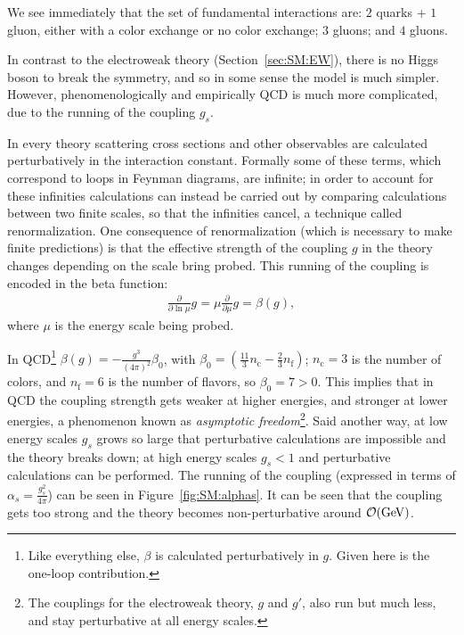 We see immediately that the set of fundamental interactions are: $2$ quarks + $1$ gluon, either with a color exchange or no color exchange; $3$ gluons; and $4$ gluons.

In contrast to the electroweak theory (Section~\ref{sec:SM:EW}), there is no Higgs boson to break the symmetry, and so in some sense the model is much simpler.
However, phenomenologically and empirically QCD is much more complicated, due to the running of the coupling $g_s$.

In every theory scattering cross sections and other observables are calculated perturbatively in the interaction constant.
Formally some of these terms, which correspond to loops in Feynman diagrams, are infinite; in order to account for these infinities calculations can instead be carried out by comparing calculations between two finite scales, so that the infinities cancel, a technique called renormalization.
One consequence of renormalization (which is necessary to make finite predictions) is that the effective strength of the coupling $g$ in the theory changes depending on the scale bring probed.
This running of the coupling is encoded in the beta function:
\begin{align}
  \frac{\partial}{\partial \ln \mu}g = \mu\frac{\partial}{\partial\mu}g = \beta(g),
\end{align}
where $\mu$ is the energy scale being probed.

In QCD\footnote{Like everything else, $\beta$ is calculated perturbatively in $g$. Given here is the one-loop contribution.} $\beta(g) = -\frac{g^3}{(4\pi)^2}\beta_0$, with $\beta_0=(\frac{11}{3}n_\text{c} - \frac{2}{3} n_\text{f})$; $n_\text{c}=3$ is the number of colors, and $n_\text{f}=6$ is the number of flavors, so $\beta_0=7>0$.
This implies that in QCD the coupling strength gets weaker at higher energies, and stronger at lower energies, a phenomenon known as \textit{asymptotic freedom}\footnote{The couplings for the electroweak theory, $g$ and $g'$, also run but much less, and stay perturbative at all energy scales.}.
Said another way, at low energy scales $g_s$ grows so large that perturbative calculations are impossible and the theory breaks down; at high energy scales $g_s<1$ and perturbative calculations can be performed.
The running of the coupling (expressed in terms of $\alpha_s = \frac{g_s^2}{4\pi}$) can be seen in Figure~\ref{fig:SM:alphas}.
It can be seen that the coupling gets too strong and the theory becomes non-perturbative around $\mathcal{O}(\mathrm{GeV})$.

